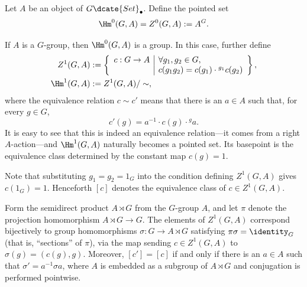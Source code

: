 \begin{definition}\label{def:nonabelian-H}
	Let $A$ be an object of $G\dcate{Set}_\bullet$. Define the pointed set
	\[ \Hm^0(G, A) = Z^0(G, A) := A^G. \]

	If $A$ is a $G$-group, then $\Hm^0(G,A)$ is a group. In this case,
	further define
	\begin{align*}
		Z^1(G, A) & := \left\{\begin{array}{r|l}
			c: G \to A & \forall g_1, g_2 \in G, \\
			& c(g_1 g_2) = c(g_1) \cdot {}^{g_1} c(g_2)
		\end{array}\right\}, \\
		\Hm^1(G, A) & := Z^1(G, A) / \sim ,
	\end{align*}
	where the equivalence relation $c\sim c'$ means that there is an
	$a\in A$ such that, for every $g\in G$,
	\[ c'(g) = a^{-1} \cdot c(g) \cdot {}^g a . \]
	It is easy to see that this is indeed an equivalence relation---it comes
	from a right $A$-action---and $\Hm^1(G,A)$ naturally becomes a pointed
	set. Its basepoint is the equivalence class determined by the constant
	map $c(g)=1$.
\end{definition}

Note that substituting $g_1=g_2=1_G$ into the condition defining
$Z^1(G,A)$ gives $c(1_G)=1$. Henceforth $[c]$ denotes the equivalence class
of $c\in Z^1(G,A)$.

\begin{remark}\label{rem:Z1-vs-section}
	Form the semidirect product $A\rtimes G$ from the $G$-group $A$, and let
	$\pi$ denote the projection homomorphism $A\rtimes G\to G$. The elements
	of $Z^1(G,A)$ correspond bijectively to group homomorphisms
	$\sigma:G\to A\rtimes G$ satisfying $\pi\sigma=\identity_G$ (that is,
	``sections'' of $\pi$), via the map sending $c\in Z^1(G,A)$ to
	$\sigma(g)=(c(g),g)$. Moreover, $[c']=[c]$ if and only if there is an
	$a\in A$ such that $\sigma'=a^{-1}\sigma a$, where $A$ is embedded as a
	subgroup of $A\rtimes G$ and conjugation is performed pointwise.
\end{remark}

